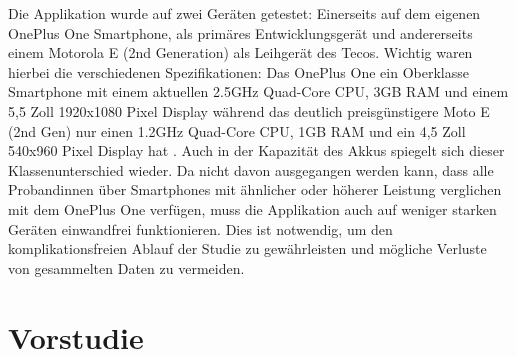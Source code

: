 Die Applikation wurde auf zwei Geräten getestet:
Einerseits auf dem eigenen OnePlus One Smartphone, als primäres Entwicklungsgerät und andererseits einem Motorola E (2nd Generation) als Leihgerät des Tecos.
Wichtig waren hierbei die verschiedenen Spezifikationen:
Das OnePlus One ein Oberklasse Smartphone mit einem aktuellen 2.5GHz Quad-Core CPU, 3GB RAM und einem 5,5 Zoll 1920x1080 Pixel Display \cite{oneplusone}
während das deutlich preisgünstigere Moto E (2nd Gen) nur einen 1.2GHz Quad-Core CPU, 1GB RAM und ein 4,5 Zoll 540x960 Pixel Display hat \cite{motoe}.
Auch in der Kapazität des Akkus spiegelt sich dieser Klassenunterschied wieder.
Da nicht davon ausgegangen werden kann, dass alle Probandinnen über Smartphones mit ähnlicher oder höherer Leistung verglichen mit dem OnePlus One verfügen, muss die Applikation auch auf weniger starken Geräten einwandfrei funktionieren.
Dies ist notwendig, um den komplikationsfreien Ablauf der Studie zu gewährleisten und mögliche Verluste von gesammelten Daten zu vermeiden.
 

\section{Vorstudie}

